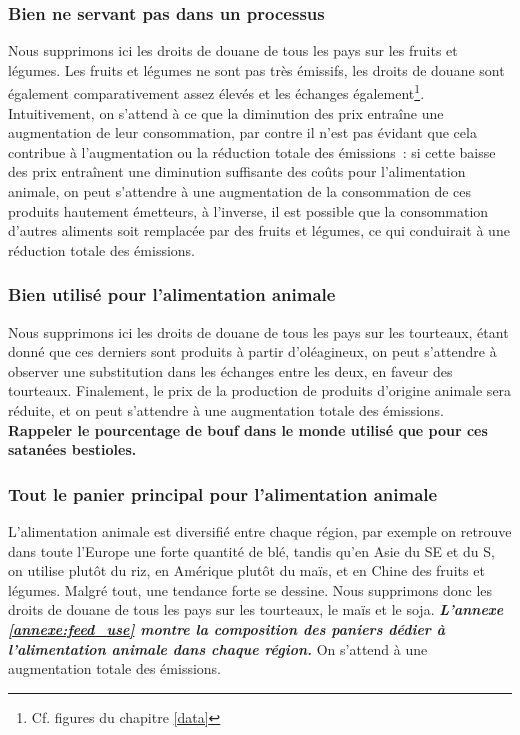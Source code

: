 \subsubsection{Bien ne servant pas dans un processus}

Nous supprimons ici les droits de douane de tous les pays sur les fruits et légumes. Les fruits et légumes ne sont pas très émissifs, les droits de douane sont également comparativement assez élevés et les échanges également\footnote{Cf. figures du chapitre \ref{data}}. Intuitivement, on s'attend à ce que la diminution des prix entraîne une augmentation de leur consommation, par contre il n'est pas évidant que cela contribue à l'augmentation ou la réduction totale des émissions~: si cette baisse des prix entraînent une diminution suffisante des coûts pour l'alimentation animale, on peut s'attendre à une augmentation de la consommation de ces produits hautement émetteurs, à l'inverse, il est possible que la consommation d'autres aliments soit remplacée par des fruits et légumes, ce qui conduirait à une réduction totale des émissions.


\subsubsection{Bien utilisé pour l'alimentation animale}

Nous supprimons ici les droits de douane de tous les pays sur les tourteaux, étant donné que ces derniers sont produits à partir d'oléagineux, on peut s'attendre à observer une substitution dans les échanges entre les deux, en faveur des tourteaux. Finalement, le prix de la production de produits d'origine animale sera réduite, et on peut s'attendre à une augmentation totale des émissions. \textbf{Rappeler le pourcentage de bouf dans le monde utilisé que pour ces satanées bestioles.}


\subsubsection{Tout le panier principal pour l'alimentation animale}

L'alimentation animale est diversifié entre chaque région, par exemple on retrouve dans toute l'Europe une forte quantité de blé, tandis qu'en Asie du SE et du S, on utilise plutôt du riz, en Amérique plutôt du maïs, et en Chine des fruits et légumes. Malgré tout, une tendance forte se dessine. Nous supprimons donc les droits de douane de tous les pays sur les tourteaux, le maïs et le soja. \textbf{\textit{L'annexe \ref{annexe:feed_use} montre la composition des paniers dédier à l'alimentation animale dans chaque région.}} On s'attend à une augmentation totale des émissions.


